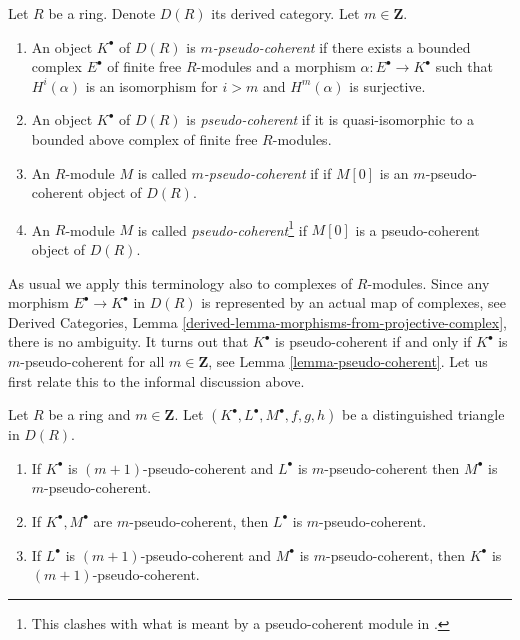 \begin{definition}
\label{definition-pseudo-coherent}
Let $R$ be a ring. Denote $D(R)$ its derived category.
Let $m \in \mathbf{Z}$.
\begin{enumerate}
\item An object $K^\bullet$ of $D(R)$ is {\it $m$-pseudo-coherent}
if there exists a bounded complex $E^\bullet$ of finite free $R$-modules
and a morphism $\alpha : E^\bullet \to K^\bullet$ such that
$H^i(\alpha)$ is an isomorphism for $i > m$ and $H^m(\alpha)$
is surjective.
\item An object $K^\bullet$ of $D(R)$ is {\it pseudo-coherent}
if it is quasi-isomorphic to a bounded above complex of finite
free $R$-modules.
\item An $R$-module $M$ is called {\it $m$-pseudo-coherent} if
if $M[0]$ is an $m$-pseudo-coherent object of $D(R)$.
\item An $R$-module $M$ is called
{\it pseudo-coherent}\footnote{This clashes with what is meant by
a pseudo-coherent module in \cite{Bourbaki-CA}.}
if $M[0]$ is a pseudo-coherent object of $D(R)$.
\end{enumerate}
\end{definition}

\noindent
As usual we apply this terminology also to complexes of $R$-modules.
Since any morphism $E^\bullet \to K^\bullet$ in $D(R)$ is represented
by an actual map of complexes, see
Derived Categories, Lemma \ref{derived-lemma-morphisms-from-projective-complex},
there is no ambiguity.
It turns out that $K^\bullet$ is pseudo-coherent if and only if
$K^\bullet$ is $m$-pseudo-coherent for all $m \in \mathbf{Z}$, see
Lemma \ref{lemma-pseudo-coherent}.
Let us first relate this to the informal discussion above.

\begin{lemma}
\label{lemma-cone-pseudo-coherent}
Let $R$ be a ring and $m \in \mathbf{Z}$.
Let $(K^\bullet, L^\bullet, M^\bullet, f, g, h)$ be a distinguished
triangle in $D(R)$.
\begin{enumerate}
\item If $K^\bullet$ is $(m + 1)$-pseudo-coherent and
$L^\bullet$ is $m$-pseudo-coherent then $M^\bullet$ is
$m$-pseudo-coherent.
\item If $K^\bullet, M^\bullet$ are $m$-pseudo-coherent, then
$L^\bullet$ is $m$-pseudo-coherent.
\item If $L^\bullet$ is $(m + 1)$-pseudo-coherent and $M^\bullet$
is $m$-pseudo-coherent, then $K^\bullet$ is $(m + 1)$-pseudo-coherent.
\end{enumerate}
\end{lemma}

